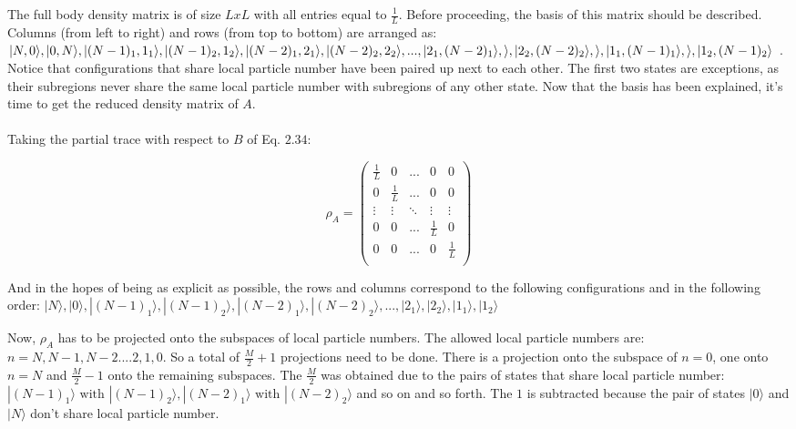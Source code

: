 The full body density matrix is of size $LxL$ with all entries equal to $\frac{1}{L}$. Before proceeding, the basis of this matrix should be described. Columns (from left to right) and rows (from top to bottom) are arranged as: \\ $| N, 0 \rangle , |0, N \rangle , | (N-1)_1, 1_1 \rangle, |(N-1)_2, 1_2 \rangle , | (N-2)_1, 2_1 \rangle , | (N-2)_2, 2_2 \rangle , ... , \\ |2_1, (N-2)_1 \rangle , \rangle, |2_2, (N-2)_2 \rangle , \rangle, |1_1, (N-1)_1 \rangle , \rangle, |1_2, (N-1)_2 \rangle  $ . Notice that configurations that share local particle number have been paired up next to each other. The first two states are exceptions, as their subregions never share the same local particle number with subregions of any other state. Now that the basis has been explained, it's time to get the reduced density matrix of $A$. \\
\\
Taking the partial trace with respect to $B$ of Eq. $2.34$:

\begin{equation}
\rho_{A} = \begin{pmatrix}
\frac{1}{L} & 0 &... & 0 & 0 \\
0 & \frac{1}{L} & ... & 0 & 0 \\
\vdots & \vdots & \ddots & \vdots & \vdots \\
0 & 0 & ... & \frac{1}{L} & 0 \\
0 & 0 & ... & 0 & \frac{1}{L} \\
\end{pmatrix}
\end{equation}

And in the hopes of being as explicit as possible, the rows and columns correspond to the following configurations and in the following order: $| N \rangle , |0 \rangle , | (N-1)_1 \rangle, |(N-1)_2 \rangle , | (N-2)_1 \rangle , | (N-2)_2 \rangle , ... , |2_1 \rangle , |2_2 \rangle , |1_1 \rangle , |1_2 \rangle $ 

Now, $\rho_{A}$ has to be projected onto the subspaces of local particle numbers. The allowed local particle numbers are: $n = N, N-1, N-2 .... 2, 1, 0$. So a total of $\frac{M}{2} + 1$ projections need to be done. There is a projection onto the subspace of $n = 0$, one onto $n = N$ and $\frac{M}{2} -1$ onto the remaining subspaces. The $\frac{M}{2}$ was obtained due to the pairs of states that share local particle number: $|(N-1)_1 \rangle \text{ with } |(N-1)_2 \rangle, |(N-2)_1 \rangle \text{ with } |(N-2)_2 \rangle$ and so on and so forth. The $1$ is subtracted because the pair of states $| 0 \rangle$ and $| N \rangle$ don't share local particle number.

